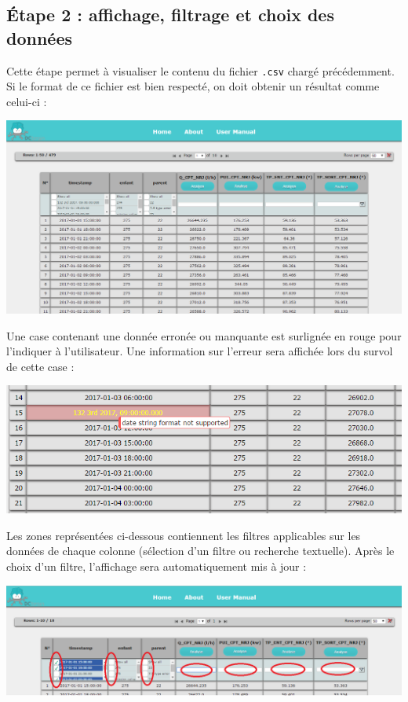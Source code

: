 	\subsection{Étape 2 : affichage, filtrage et choix des données}
		Cette étape permet à visualiser le contenu du fichier \lstinline!.csv! chargé précédemment. Si le format de ce fichier est bien respecté, on doit obtenir un résultat comme celui-ci :
		\begin{center}\includegraphics[scale=0.45]{fenetre2.png}\end{center}
		
		Une case contenant une donnée erronée ou manquante est surlignée en rouge pour l'indiquer à l'utilisateur. Une information sur l'erreur sera affichée lors du survol de cette case :
		
		\begin{center}\includegraphics[scale=0.45]{fenetre2Erreur.png}\end{center}
		
		Les zones représentées ci-dessous contiennent les filtres applicables sur les données de chaque colonne (sélection d'un filtre ou recherche textuelle). Après le choix d'un filtre, l'affichage sera automatiquement mis à jour :
		
		\begin{center}\includegraphics[scale=0.45]{fenetre2Filtre.png}\end{center}
		
